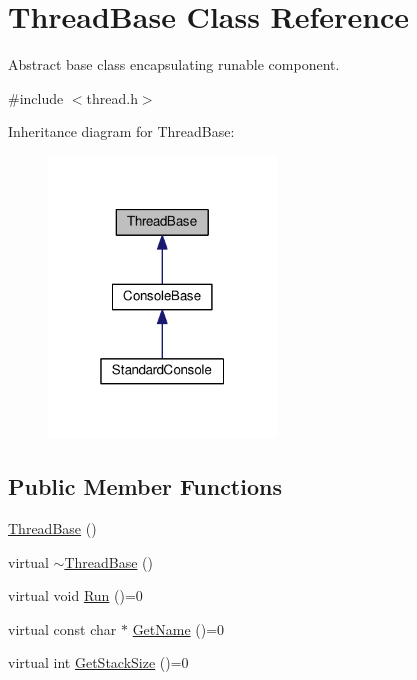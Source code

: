 \hypertarget{classThreadBase}{}\section{Thread\+Base Class Reference}
\label{classThreadBase}


Abstract base class encapsulating runable component.  




{\ttfamily \#include $<$thread.\+h$>$}



Inheritance diagram for Thread\+Base\+:\nopagebreak
\begin{figure}[H]
\begin{center}
\leavevmode
\includegraphics[width=172pt]{classThreadBase__inherit__graph}
\end{center}
\end{figure}
\subsection*{Public Member Functions}
\begin{DoxyCompactItemize}
\item 
\hyperlink{classThreadBase_af66330f2f5605a8f104ec346014da976}{Thread\+Base} ()
\item 
virtual \hyperlink{classThreadBase_a3dbbd3714a3a446c74258c34bf9f6da0}{$\sim$\+Thread\+Base} ()
\item 
virtual void \hyperlink{classThreadBase_a795d258c1f40c123859d0e83dce6a0ad}{Run} ()=0
\item 
virtual const char $\ast$ \hyperlink{classThreadBase_a1d02a7e6cd287e1d72b9cac00e8061d4}{Get\+Name} ()=0
\item 
virtual int \hyperlink{classThreadBase_a676ce2be4c9801fdfdc30f484547caef}{Get\+Stack\+Size} ()=0
\end{DoxyCompactItemize}


